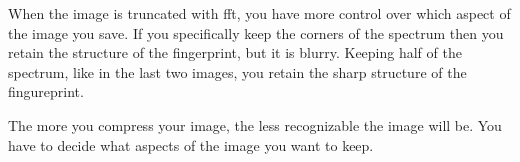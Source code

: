\documentclass[11pt]{article}
\begin{document}
When the image is truncated with fft, you have more control over which
aspect of the image you save. If you specifically keep the corners of
the spectrum then you retain the structure of the fingerprint, but it is
blurry. Keeping half of the spectrum, like in the last two images, you
retain the sharp structure of the fingureprint.

The more you compress your image, the less recognizable the image will
be. You have to decide what aspects of the image you want to keep.


    
    
    
    
\end{document}
